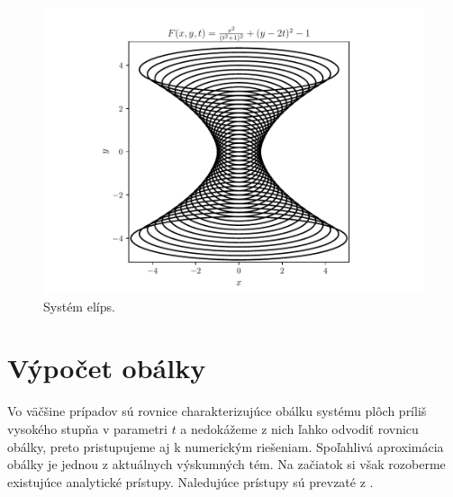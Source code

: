 \begin{figure}[H]
	\centering
	\includegraphics{images/too_complicated_equations.pdf}
	\caption{Systém elíps.}
	\label{fig:too_complicated_equations}
\end{figure}


\section{Výpočet obálky}
Vo väčšine prípadov sú rovnice charakterizujúce obálku systému plôch príliš vysokého stupňa v parametri $t$ a nedokážeme z nich ľahko odvodiť rovnicu obálky, preto pristupujeme aj k numerickým riešeniam. Spoľahlivá aproximácia obálky je jednou z aktuálnych výskumných tém. Na začiatok si však rozoberme existujúce analytické prístupy. Naledujúce prístupy sú prevzaté z \cite{Vra22}.
